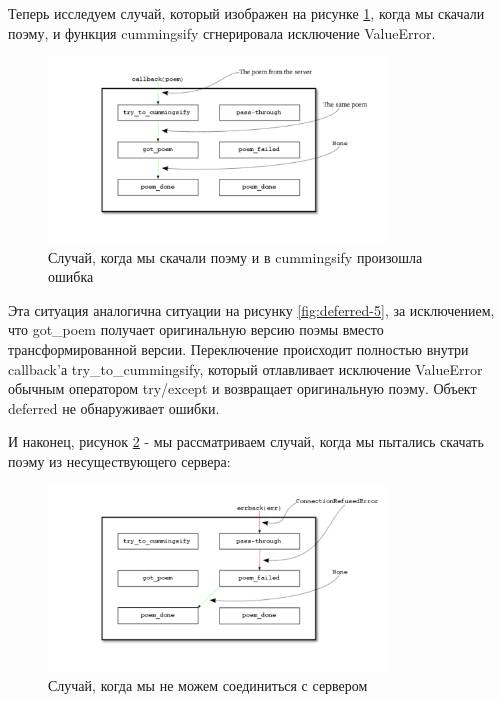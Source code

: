 Теперь исследуем случай, который изображен на рисунке \ref{fig:deferred-7}, 
когда мы скачали поэму, и функция cummingsify 
сгнерировала исключение ValueError.

\begin{figure}[h]
\begin{center}
    \includegraphics[width=0.8\textwidth]{images/deferred-7.pdf}
    \caption{Случай, когда мы скачали поэму и в cummingsify произошла ошибка\label{fig:deferred-7}}
\end{center}
\end{figure}


Эта ситуация аналогична ситуации на рисунку \ref{fig:deferred-5}, 
за исключением, что got\_poem получает оригинальную версию поэмы 
вместо трансформированной версии. Переключение происходит полностью 
внутри callback'а try\_to\_cummingsify, который отлавливает 
исключение ValueError обычным оператором try/except и возвращает 
оригинальную поэму. Объект deferred не обнаруживает ошибки.


И наконец, рисунок \ref{fig:deferred-8} - мы рассматриваем случай, когда мы пытались скачать 
поэму из несуществующего сервера:

\begin{figure}[h]
\begin{center}
    \includegraphics[width=0.8\textwidth]{images/deferred-8.pdf}
    \caption{Случай, когда мы не можем соединиться с сервером\label{fig:deferred-8}}
\end{center}
\end{figure}



